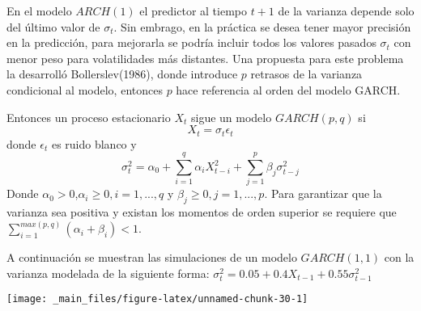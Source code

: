 \documentclass[
  a4paper,
  oneside,
  openany]{book}
\begin{document}
En el modelo \(ARCH(1)\) el predictor al tiempo \(t + 1\) de la
varianza depende solo del último valor de \(\sigma_t\). Sin embrago, en la práctica se desea tener mayor precisión en la predicción, para mejorarla se podría incluir todos los valores pasados \(\sigma_t\) con menor peso para volatilidades más distantes.
Una propuesta para este problema la desarrolló Bollerslev(1986), donde introduce \(p\) retrasos de la varianza condicional al modelo, entonces \(p\) hace referencia al orden del modelo GARCH.

Entonces un proceso estacionario \(X_t\) sigue un modelo \(GARCH(p,q)\) si
\[
X_t=\sigma_t\epsilon_t
\]
donde \(\epsilon_t\) es ruido blanco y
\[
\sigma^2_{t} = \alpha_0+\sum_{i=1}^q \alpha_i X^2_{t-i}+\sum_{j=1}^p \beta_j\sigma^2_{t-j}
\]
Donde \(\alpha_0>0\),\(\alpha_i\ge0, i=1,...,q\) y \(\beta_j\ge0, j=1,...,p\). Para garantizar que la varianza sea positiva y existan los momentos de orden superior se requiere que \(\sum_{i=1}^{max(p,q)}(\alpha_i+\beta_i)<1\).

A continuación se muestran las simulaciones de un modelo \(GARCH(1,1)\) con la varianza modelada de la siguiente forma: \(\sigma^2_{t}=0.05+ 0.4X_{t-1}+0.55\sigma^2_{t-1}\)

\begin{center}\texttt{[image: \_main\_files/figure-latex/unnamed-chunk-30-1]} \end{center}

  
\end{document}
